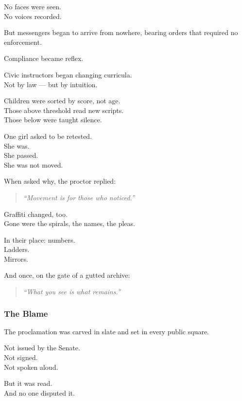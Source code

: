 \documentclass[12pt]{article}
\begin{document}
No faces were seen.\\
No voices recorded.

But messengers began to arrive from nowhere, bearing orders that required no enforcement.

Compliance became reflex.

\vspace{1em}

Civic instructors began changing curricula.\\
Not by law — but by intuition.

Children were sorted by score, not age.\\
Those above threshold read new scripts.\\
Those below were taught silence.

One girl asked to be retested.\\
She was.\\
She passed.\\
She was not moved.

When asked why, the proctor replied:

\begin{quote}
\textit{“Movement is for those who noticed.”}
\end{quote}

\vspace{1em}

Graffiti changed, too.\\
Gone were the spirals, the names, the pleas.

In their place: numbers.\\
Ladders.\\
Mirrors.

And once, on the gate of a gutted archive:

\begin{quote}
\textit{“What you see is what remains.”}
\end{quote}

\dotfill

\subsubsection*{The Blame}

The proclamation was carved in slate and set in every public square.

Not issued by the Senate.\\
Not signed.\\
Not spoken aloud.

But it was read.\\
And no one disputed it.
\end{document}
